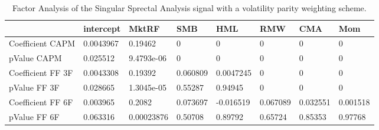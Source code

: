 \begin{table}[H]
\centering
\begin{tabular}{llllllll}
& intercept & MktRF & SMB & HML & RMW & CMA & Mom \\ 
\hline 
Coefficient CAPM & 0.0043967 & 0.19462 & 0 & 0 & 0 & 0 & 0 \\ 
pValue CAPM & 0.025512 & 9.4793e-06 & 0 & 0 & 0 & 0 & 0 \\ 
Coefficient FF 3F & 0.0043308 & 0.19392 & 0.060809 & 0.0047245 & 0 & 0 & 0 \\ 
pValue FF 3F & 0.028665 & 1.3045e-05 & 0.55287 & 0.94945 & 0 & 0 & 0 \\ 
Coefficient FF 6F & 0.003965 & 0.2082 & 0.073697 & -0.016519 & 0.067089 & 0.032551 & 0.001518 \\ 
pValue FF 6F & 0.063316 & 0.00023876 & 0.50708 & 0.89792 & 0.65724 & 0.85353 & 0.97768 \\ 
\hline
\end{tabular}
\caption{Factor Analysis of the Singular Sprectal Analysis signal with a volatility parity weighting scheme.}
\label{SSA_FACTOR}
\end{table}